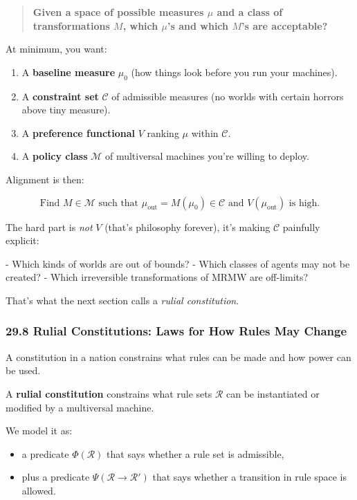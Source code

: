\begin{quote}
\textbf{Given a space of possible measures $\mu$ and a class of transformations $M$, which $\mu$’s and which $M$’s are acceptable?}
\end{quote}

At minimum, you want:

\begin{enumerate}
  \item A \textbf{baseline measure} $\mu_0$ (how things look before you run your machines).
  \item A \textbf{constraint set} $\mathcal{C}$ of admissible measures (no worlds with certain horrors above tiny measure).
  \item A \textbf{preference functional} $V$ ranking $\mu$ within $\mathcal{C}$.
  \item A \textbf{policy class} $\mathcal{M}$ of multiversal machines you’re willing to deploy.
\end{enumerate}

Alignment is then:

\[
  \text{Find } M \in \mathcal{M} \text{ such that } \mu_{\text{out}} = M(\mu_0) \in \mathcal{C} \text{ and } V(\mu_{\text{out}}) \text{ is high.}
\]

The hard part is \emph{not} $V$ (that’s philosophy forever),
it’s making $\mathcal{C}$ painfully explicit:

- Which kinds of worlds are out of bounds?
- Which classes of agents may not be created?
- Which irreversible transformations of MRMW are off-limits?

That’s what the next section calls a \emph{rulial constitution}.

\subsubsection*{29.8  Rulial Constitutions: Laws for How Rules May Change}

A constitution in a nation constrains what rules can be made and how power can be used.

A \textbf{rulial constitution} constrains what rule sets $\mathcal{R}$ can be instantiated or modified by a multiversal machine.

We model it as:

\begin{itemize}
  \item a predicate $\Phi(\mathcal{R})$ that says whether a rule set is admissible,
  \item plus a predicate $\Psi(\mathcal{R} \to \mathcal{R}')$ that says whether a transition in rule space is allowed.
\end{itemize}


